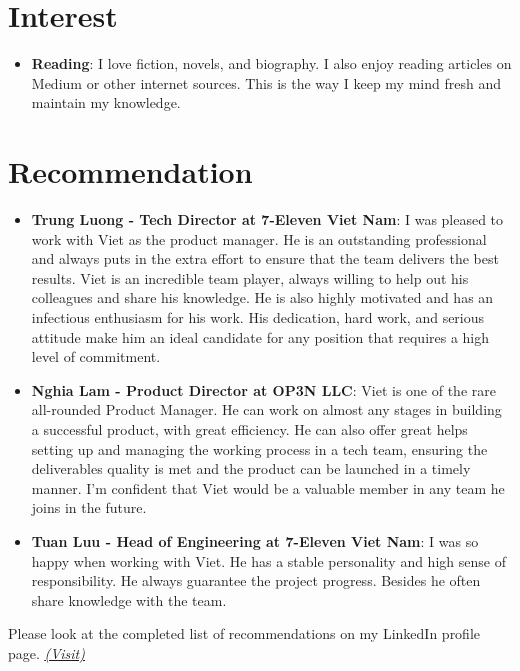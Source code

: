 \documentclass[letterpaper,11pt]{article}
\newcommand{\resumeItem}[2]{
  \item\small{
    \textbf{#1}{: #2 \vspace{-2pt}}
  }
}
\newcommand{\resumeSubItem}[2]{\resumeItem{#1}{#2}\vspace{-4pt}}
\newcommand{\resumeSubHeadingListStart}{\begin{itemize}[leftmargin=*]}
\newcommand{\resumeSubHeadingListEnd}{\end{itemize}}
\begin{document}
\section{Interest}
\resumeSubHeadingListStart
  \resumeSubItem{Reading}
    {I love fiction, novels, and biography. I also enjoy reading articles on Medium or other internet sources. This is the way I keep my mind fresh and maintain my knowledge.}
\resumeSubHeadingListEnd

\section{Recommendation}
    \resumeSubHeadingListStart
        \resumeSubItem{Trung Luong - Tech Director at 7-Eleven Viet Nam}
            {I was pleased to work with Viet as the product manager. He is an outstanding professional and always puts in the extra effort to ensure that the team delivers the best results. Viet is an incredible team player, always willing to help out his colleagues and share his knowledge. He is also highly motivated and has an infectious enthusiasm for his work. His dedication, hard work, and serious attitude make him an ideal candidate for any position that requires a high level of commitment.}
         \resumeSubItem{Nghia Lam - Product Director at OP3N LLC}
            {Viet is one of the rare all-rounded Product Manager. He can work on almost any stages in building a successful product, with great efficiency. He can also offer great helps setting up and managing the working process in a tech team, ensuring the deliverables quality is met and the product can be launched in a timely manner. I’m confident that Viet would be a valuable member in any team he joins in the future.}
        \resumeSubItem{Tuan Luu - Head of Engineering at 7-Eleven Viet Nam}
            {I was so happy when working with Viet. He has a stable personality and high sense of responsibility. He always guarantee the project progress. Besides he often share knowledge with the team.}
    \resumeSubHeadingListEnd
    {Please look at the completed list of recommendations on my LinkedIn profile page.} \href{https://www.linkedin.com/in/vietch2612/details/recommendations/?detailScreenTabIndex=0}{\underline{\textit{(Visit)}}}

\end{document}
